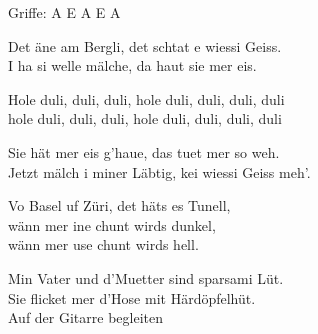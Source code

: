 \documentclass[
  letterpaper,
  a5paper]{memoir}
\begin{document}
Griffe: A E A E A

Det äne am Bergli, det schtat e wiessi Geiss.\\
I ha si welle mälche, da haut sie mer eis.

\begin{tcolorbox}[enhanced jigsaw, breakable, bottomrule=.15mm, colframe=quarto-callout-color-frame, rightrule=.15mm, opacityback=0, colback=white, arc=.35mm, toprule=.15mm, leftrule=.75mm, left=2mm]

Hole duli, duli, duli, hole duli, duli, duli, duli\\
hole duli, duli, duli, hole duli, duli, duli, duli

\end{tcolorbox}

Sie hät mer eis g'haue, das tuet mer so weh.\\
Jetzt mälch i miner Läbtig, kei wiessi Geiss meh'.

Vo Basel uf Züri, det häts es Tunell,\\
wänn mer ine chunt wirds dunkel,\\
wänn mer use chunt wirds hell.

Min Vater und d'Muetter sind sparsami Lüt.\\
Sie flicket mer d'Hose mit Härdöpfelhüt.\\
Auf der Gitarre begleiten


\backmatter
\end{document}
